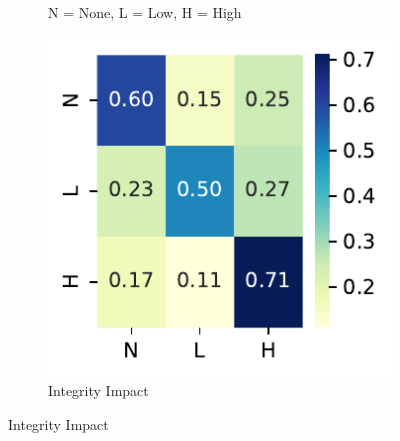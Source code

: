 \documentclass[12pt]{article}
\begin{document}
\begin{figure}
\begin{subfigure}[b]{0.45\textwidth}
		\begin{tablenotes}
			\footnotesize
			\item \quad N = None, L = Low, H = High
		\end{tablenotes}
	\end{subfigure}

	\vspace{1em}

	\begin{subfigure}[b]{0.45\textwidth}
		\includegraphics[width=\textwidth]{./figures/confusion_matrices/integrity_impact_nvd.pdf}
		\caption{Integrity Impact}


\end{subfigure}
\end{figure}
\end{document}
